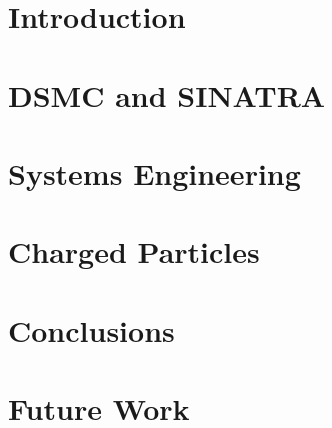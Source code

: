 \chapter{Introduction}
\label{chap:intro}


\chapter{DSMC and SINATRA}
\label{chap:dsmc}



\chapter{Systems Engineering}
\label{chap:systems}




\chapter{Charged Particles}
\label{chap:charge}



\chapter{Conclusions}
\label{chap:conclusions}


\chapter{Future Work}
